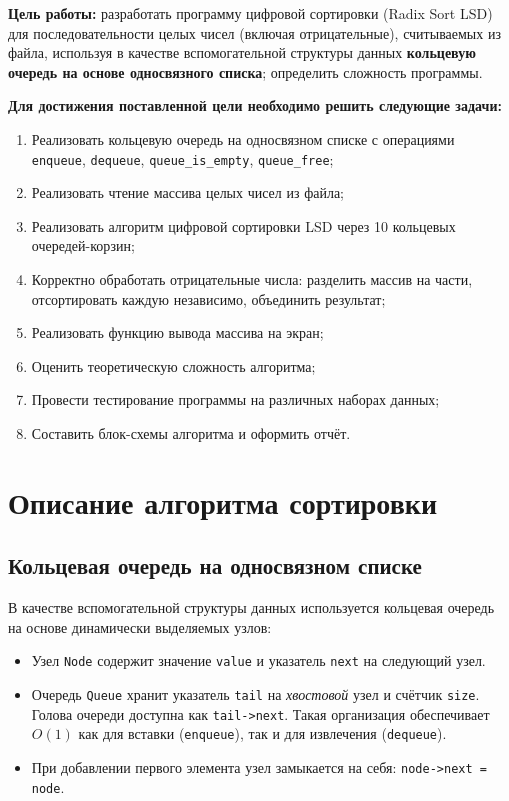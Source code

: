 \documentclass[a4paper,14pt]{extarticle}
\begin{document}
\textbf{Цель работы:} разработать программу цифровой сортировки (Radix Sort LSD) для последовательности целых чисел (включая отрицательные), считываемых из файла, используя в качестве вспомогательной структуры данных \textbf{кольцевую очередь на основе односвязного списка}; определить сложность программы.

\vspace{0.5cm}
\textbf{Для достижения поставленной цели необходимо решить следующие задачи:}
\begin{enumerate}
  \item Реализовать кольцевую очередь на односвязном списке с операциями \texttt{enqueue}, \texttt{dequeue}, \texttt{queue\_is\_empty}, \texttt{queue\_free};
  \item Реализовать чтение массива целых чисел из файла;
  \item Реализовать алгоритм цифровой сортировки LSD через 10 кольцевых очередей-корзин;
  \item Корректно обработать отрицательные числа: разделить массив на части, отсортировать каждую независимо, объединить результат;
  \item Реализовать функцию вывода массива на экран;
  \item Оценить теоретическую сложность алгоритма;
  \item Провести тестирование программы на различных наборах данных;
  \item Составить блок-схемы алгоритма и оформить отчёт.
\end{enumerate}

\newpage
\section{Описание алгоритма сортировки}

\subsection{Кольцевая очередь на односвязном списке}

В качестве вспомогательной структуры данных используется кольцевая очередь на основе динамически выделяемых узлов:

\begin{itemize}
  \item Узел \texttt{Node} содержит значение \texttt{value} и указатель \texttt{next} на следующий узел.
  \item Очередь \texttt{Queue} хранит указатель \texttt{tail} на \textit{хвостовой} узел и счётчик \texttt{size}. Голова очереди доступна как \texttt{tail->next}. Такая организация обеспечивает $O(1)$ как для вставки (\texttt{enqueue}), так и для извлечения (\texttt{dequeue}).
  \item При добавлении первого элемента узел замыкается на себя: \texttt{node->next = node}.
\end{itemize}
\end{document}
